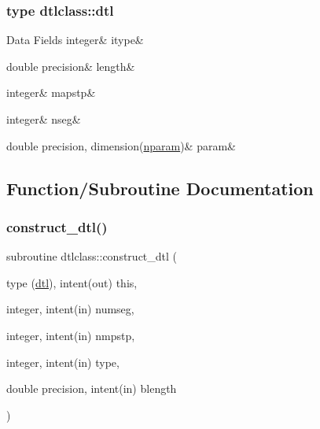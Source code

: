 \subsubsection{type dtlclass\+::dtl}
\begin{DoxyFields}{Data Fields}
\mbox{\label{namespacedtlclass_a75f1d8c2908cb2ac40cd24dc45a122ff}} 
integer&
itype&
\\
\hline

\mbox{\label{namespacedtlclass_ac3b7a490164af376dab82d59957bcdd3}} 
double precision&
length&
\\
\hline

\mbox{\label{namespacedtlclass_ad89c7805074fee80c05af3ae3861cb87}} 
integer&
mapstp&
\\
\hline

\mbox{\label{namespacedtlclass_ab0c5195ab0993ee3107484257b94cfe5}} 
integer&
nseg&
\\
\hline

\mbox{\label{namespacedtlclass_a95bc1c81e12444e39d8ea61b6e67ae34}} 
double precision, dimension(\mbox{\hyperlink{namespacedtlclass_adf04761c96168c3dc492c89c72194cea}{nparam}})&
param&
\\
\hline

\end{DoxyFields}


\subsection{Function/\+Subroutine Documentation}
\mbox{\label{namespacedtlclass_a5f65e89a18b2765e966ea8c1db85aa0c}} 
\subsubsection{\texorpdfstring{construct\_dtl()}{construct\_dtl()}}
{\footnotesize\ttfamily subroutine dtlclass\+::construct\+\_\+dtl (\begin{DoxyParamCaption}\item[{type (\mbox{\hyperlink{namespacedtlclass_structdtlclass_1_1dtl}{dtl}}), intent(out)}]{this,  }\item[{integer, intent(in)}]{numseg,  }\item[{integer, intent(in)}]{nmpstp,  }\item[{integer, intent(in)}]{type,  }\item[{double precision, intent(in)}]{blength }\end{DoxyParamCaption})}

